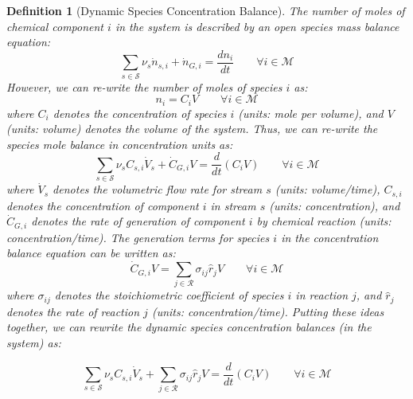 \documentclass{article}[11pt]
\newtheorem{defn}{Definition}
\begin{document}
\begin{defn}[Dynamic Species Concentration Balance]\label{defn-dynamic-species-concentration-balance}
The number of moles of chemical component $i$ in the system is described by an open species mass balance equation:
\begin{equation}
\sum_{s\in\mathcal{S}}\nu_{s}\dot{n}_{s,i} + \dot{n}_{G,i} = \frac{dn_{i}}{dt}
\qquad\forall{i}\in\mathcal{M}
\end{equation}
However, we can re-write the number of moles of species $i$ as:
\begin{equation}
n_{i} = C_{i}V\qquad\forall{i}\in\mathcal{M}
\end{equation}
where $C_{i}$ denotes the concentration of species $i$ (units: mole per volume), and $V$ (units: volume) denotes the volume of the system. 
Thus, we can re-write the species mole balance in concentration units as:
\begin{equation}\label{eqn:concentration-balance}
\sum_{s\in\mathcal{S}}\nu_{s}C_{s,i}\dot{V}_{s} + \dot{C}_{G,i}V = \frac{d}{dt}\left(C_{i}V\right)\qquad\forall{i}\in\mathcal{M}
\end{equation}
where $\dot{V}_{s}$ denotes the volumetric flow rate for stream $s$ (units: volume/time), 
$C_{s,i}$ denotes the concentration of component $i$ in stream $s$ (units: concentration), 
and $\dot{C}_{G,i}$ denotes the rate of generation of component $i$ by chemical reaction (units: concentration/time).
The generation terms for species $i$ in the concentration balance equation can be written as:
\begin{equation}\label{eqn:concentration-gen-terms}
\dot{C}_{G,i}V = \sum_{j\in\mathcal{R}}\sigma_{ij}\hat{r}_{j}V\qquad\forall{i}\in\mathcal{M}
\end{equation}
where $\sigma_{ij}$ denotes the stoichiometric coefficient of species $i$ in reaction $j$, 
and $\hat{r}_{j}$ denotes the rate of reaction $j$ (units: concentration/time).
Putting these ideas together, we can rewrite the dynamic species concentration balances (in the system) as:
\begin{mdframed}[backgroundcolor=lgray]
\begin{equation}\label{eqn:concentration-balance-with-extent}
\sum_{s\in\mathcal{S}}\nu_{s}C_{s,i}\dot{V}_{s} + \sum_{j\in\mathcal{R}}\sigma_{ij}\hat{r}_{j}V = \frac{d}{dt}\left(C_{i}V\right)\qquad\forall{i\in\mathcal{M}}
\end{equation}
\end{mdframed}
\end{defn}
\end{document}
